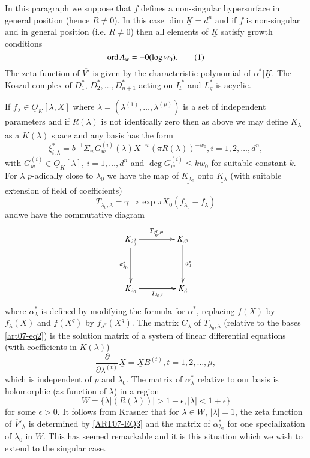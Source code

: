 In this paragraph we suppose that $f$ defines a non-singular hypersurface in general position (hence $R\neq 0$). In this case $\dim \underline{K}=d^{n}$ and if $\overline{f}$ is non-singular and in general position (i.e. $\overline{R}\neq 0$) then all elements of $\underline{K}$ satisfy growth conditions 
\begin{equation*}
\operatorname{\mathrm{ord}} A_{w}=-0(\log w_{0}).\tag{1}\label{art07-eq1}
\end{equation*}
The zeta function of $\overline{V'}$ is given by the characteristic polynomial of $\alpha^{*}|\underline{K}$. The Koszul complex of $D^{*}_{1}$, $D^{*}_{2},\ldots,D^{*}_{n+1}$ acting on $\underline{L^{*}}$ and $L^{*}_{g}$ is acyclic.

If $f_{\lambda}\in \underline{O}_{K}[\lambda,X]$ where $\lambda=(\lambda^{(1)},\ldots,\lambda^{(\mu)})$ is a set of independent parameters and if $R(\lambda)$ is not identically zero then as above we may define $\underline{K_{\lambda}}$ as a $K(\lambda)$ space and any basis has the form
\begin{equation*}
\xi^{*}_{i,\lambda}=b^{-1}\Sigma_{w}G^{(i)}_{w}(\lambda)X^{-w}(\pi R(\lambda))^{-w_{0}}, i=1,2,\ldots,d^{n},\tag{2}\label{art07-eq2}
\end{equation*}
with $G^{(i)}_{w}\in \underline{O}_{K}[\lambda]$, $i=1,\ldots,d^{n}$ and $\deg G^{(i)}_{w}\leq kw_{0}$ for suitable constant $k$. For $\lambda$ $p$-adically close to $\lambda_{0}$ we have the map of $\underline{K_{\lambda_{0}}}$ onto $\underline{K_{\lambda}}$ (with suitable extension of field of coefficients)
$$
T_{\lambda_{0},\lambda}=\gamma_{-}\circ \exp \pi X_{0}(f_{\lambda_{0}}-f_{\lambda})
$$
and\pageoriginale we have the commutative diagram
\[
\xymatrix@=1.5cm{
K_{\lambda^{q}_{0}}\ar[r]^-{T_{\lambda^{q}_{0},\lambda^{q}}}\ar[d]_-{\alpha^{*}_{\lambda_{0}}} & K_{\lambda^{q}}\ar[d]^-{\alpha^{*}_{\lambda}} \\
K_{\lambda_{0}}\ar[r]_-{T_{\lambda_{0},\lambda}} & K_{\lambda}
}
\]
where $\alpha^{*}_{\lambda}$ is defined by modifying the formula for $\alpha^{*}$, replacing $f(X)$ by $f_{\lambda}(X)$ and $f(X^{q})$ by $f_{\lambda^{q}}(X^{q})$. The matrix $C_{\lambda}$ of $T_{\lambda_{0},\lambda}$ (relative to the bases \eqref{art07-eq2}) is the solution matrix of a system of linear differential equations (with coefficients in $K(\lambda)$)
\begin{equation*}
\dfrac{\partial}{\partial \lambda^{(t)}}\underline{X}=\underline{X}B^{(t)}, t=1,2,\ldots,\mu,\tag{3}\label{ART07-EQ3}
\end{equation*}
which is independent of $p$ and $\lambda_{0}$. The matrix of $\alpha^{*}_{\lambda}$ relative to our basis is holomorphic (as function of $\lambda$) in a region
\begin{equation*}
W=\{\lambda|(R(\lambda))|>1-\epsilon, |\lambda|<1+\epsilon\}\tag{4}\label{art07-eq4}
\end{equation*}
for some $\epsilon>0$. It follows from Krasner that for $\lambda\in W$, $|\lambda|=1$, the zeta function of $\overline{V}'_{\lambda}$ is determined by \eqref{ART07-EQ3} and the matrix of $\alpha^{*}_{\lambda_{0}}$ for one specialization of $\lambda_{0}$ in $W$. This has seemed remarkable and it is this situation which we wish to extend to the singular case.

